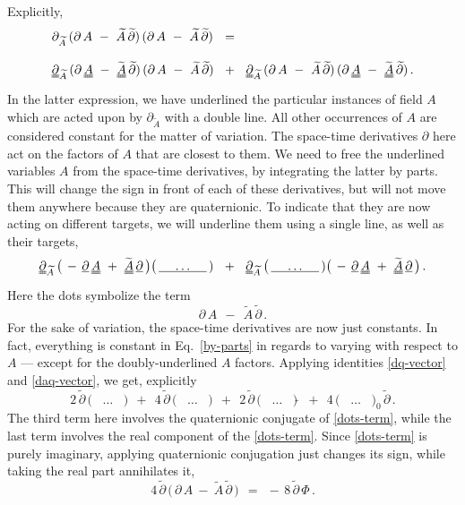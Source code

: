 \documentclass[epsfig,12pt]{article}
\newcommand{\p}{\partial}
\newcommand{\wt}{\widetilde}
\begin{document}
	Explicitly,
\begin{align}
%
\notag
	& \p_{\wt A}\, (\p\, A ~-~ \wt A\,\wt \p)\, (\p\, A ~-~ \wt A\,\wt \p)	~~=~~
	\\[3mm]
%
	& \uuline\p{}_{\wt A}\, (\p\, \uuline A ~-~ \wt{\uuline A}\,\wt \p)\, (\p\, A ~-~ \wt A\,\wt \p)
	~~+~~
	\uuline\p{}_{\wt A}\, (\p\, A ~-~ \wt A\,\wt \p)\, (\p\, \uuline A ~-~ \wt{\uuline A}\,\wt \p)\,.
\end{align}
	In the latter expression, we have underlined the particular instances of field $ A $ which are acted
	upon by $ \p_{\wt A} $ with a double line.
	All other occurrences of $ A $ are considered constant for the matter of variation.
	The space-time derivatives $ \p $ here act on the factors of $ A $ that are closest to them.
	We need to free the underlined variables $ A $ from the space-time derivatives, by integrating the latter
	by parts.
	This will change the sign in front of each of these derivatives, but will not move them anywhere
	because they are quaternionic.
	To indicate that they are now acting on different targets, we will underline them using a single line,
	as well as their targets,
\begin{equation}
\label{by-parts}
	\uuline\p{}_{\wt A}\,	\big(\, -\,\uline\p\,\uuline A ~+~ \wt{\uuline A}\,\uline\p \,\big)
				\big(\, \uline{~~~~\dots~~~~} \,)
	~~+~~
	\uuline\p{}_{\wt A}\,	\big(\, \uline{~~~~\dots~~~~} \,)
				\big(\, -\,\uline\p\,\uuline A ~+~ \wt{\uuline A}\,\uline\p \,\big)\,.
\end{equation}
	Here the dots symbolize the term
\begin{equation}
\label{dots-term}
	\p\,A  ~~-~~  \wt A\,\wt\p\,.
\end{equation}
	For the sake of variation, the space-time derivatives are now just constants.
	In fact, everything is constant in Eq.~\eqref{by-parts} in regards to varying with respect to $ A $ ---
	except for the doubly-underlined $ A $ factors.
	Applying identities \eqref{dq-vector} and \eqref{daq-vector}, we get, explicitly
\begin{equation}
\label{varied}
	2\,\wt\p\, \big(\, ~~~\dots~~~ \,)  ~~+~~
	4\,\wt\p\, \big(\, ~~~\dots~~~ \,)  ~~+~~
	2\,\wt\p\, \big(\, ~~~\dots~~~ \,)\wt{~}  ~~+~~
	4\, \big(\, ~~~\dots~~~ \,)_0\,\wt\p\,.
\end{equation}
	The third term here involves the quaternionic conjugate of \eqref{dots-term},
	while the last term involves the real component of the \eqref{dots-term}.
	Since \eqref{dots-term} is purely imaginary, applying quaternionic conjugation just changes its sign,
	while taking the real part annihilates it,
\begin{equation}
	4\,\wt\p\,\big(\, \p\,A ~-~ \wt A\,\wt\p \,\big)	~~=~~	-\,8\,\wt\p\,\Phi\,.
\end{equation}
\end{document}
